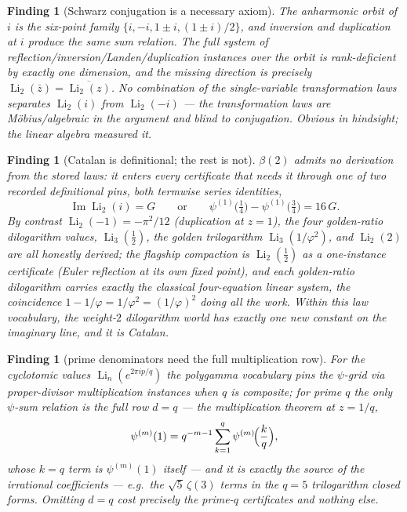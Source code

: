 \documentclass[11pt]{article}
\newtheorem{finding}[result]{Finding}
\theoremstyle{remark}
\newcommand{\Li}{\operatorname{Li}}
\newcommand{\Catalan}{G}
\begin{document}
\begin{finding}[Schwarz conjugation is a necessary axiom]\label{find:schwarz}
The anharmonic orbit of $i$ is the six-point family $\{i,-i,1\pm i,(1\pm i)/2\}$, and
inversion and duplication at $i$ produce the same sum relation. The full system of
reflection/inversion/Landen/duplication instances over the orbit is rank-deficient by
\emph{exactly one} dimension, and the missing direction is precisely
$\Li_2(\bar z)=\overline{\Li_2(z)}$. No combination of the single-variable transformation
laws separates $\Li_2(i)$ from $\Li_2(-i)$ --- the transformation laws are
M\"obius/algebraic in the argument and blind to conjugation. Obvious in hindsight; the
linear algebra \emph{measured} it.
\end{finding}

\begin{finding}[Catalan is definitional; the rest is not]\label{find:catalan}
$\beta(2)$ admits no derivation from the stored laws: it enters every certificate that
needs it through one of two recorded definitional pins, both termwise series identities,
\[
\operatorname{Im}\Li_2(i)=\Catalan
\qquad\text{or}\qquad
\psi^{(1)}\!\bigl(\tfrac14\bigr)-\psi^{(1)}\!\bigl(\tfrac34\bigr)=16\,\Catalan .
\]
By contrast $\Li_2(-1)=-\pi^2/12$ (duplication at $z=1$), the four golden-ratio dilogarithm
values, $\Li_3(\tfrac12)$, the golden trilogarithm $\Li_3(1/\varphi^2)$, and $\Li_2(2)$
are all honestly derived; the flagship compaction is $\Li_2(\tfrac12)$ as a
\emph{one-instance} certificate (Euler reflection at its own fixed point), and each
golden-ratio dilogarithm carries exactly the classical four-equation linear system, the
coincidence $1-1/\varphi=1/\varphi^2=(1/\varphi)^2$ doing all the work. Within this law
vocabulary, the weight-$2$ dilogarithm world has exactly one new constant on the imaginary
line, and it is Catalan.
\end{finding}

\begin{finding}[prime denominators need the full multiplication row]\label{find:primeq}
For the cyclotomic values $\Li_n(e^{2\pi ip/q})$ the polygamma vocabulary pins the
$\psi$-grid via proper-divisor multiplication instances when $q$ is composite; for
\emph{prime} $q$ the only $\psi$-sum relation is the full row $d=q$ --- the multiplication
theorem at $z=1/q$,
\[
\psi^{(m)}(1)=q^{-m-1}\sum_{k=1}^{q}\psi^{(m)}\!\Bigl(\frac{k}{q}\Bigr),
\]
whose $k=q$ term is $\psi^{(m)}(1)$ itself --- and it is exactly the source of the
irrational coefficients --- e.g.\ the
$\sqrt5\,\zeta(3)$ terms in the $q=5$ trilogarithm closed forms. Omitting $d=q$ cost
precisely the prime-$q$ certificates and nothing else.
\end{finding}
\end{document}
